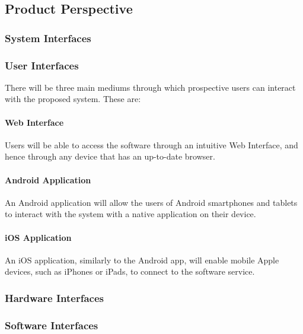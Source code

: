 \documentclass[10pt,a4paper]{article}
\begin{document}
		\subsection{Product Perspective}
		
			\subsubsection{System Interfaces}
			
			\subsubsection{User Interfaces}
		
				There will be three main mediums through which prospective users can interact with the proposed system. These are:
				
				\paragraph{Web Interface}
				
					Users will be able to access the software through an intuitive Web Interface, and hence through any device that has an up-to-date browser.			
				
				\paragraph{Android Application}
				
					An Android application will allow the users of Android smartphones and tablets to interact with the system with a native application on their device.
				
				\paragraph{iOS Application}
		
					An iOS application, similarly to the Android app, will enable mobile Apple devices, such as iPhones or iPads, to connect to the software service.
		
			\subsubsection{Hardware Interfaces}
			
			\subsubsection{Software Interfaces}
			
\end{document}
